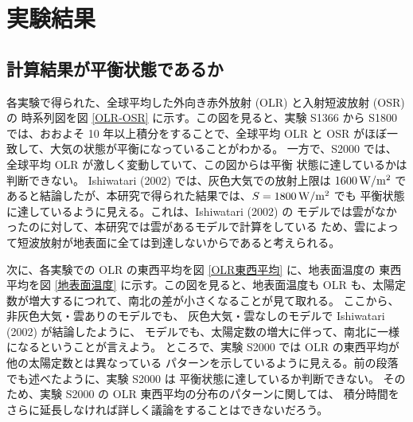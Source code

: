 \documentclass[body]{subfiles}
\begin{document}
\chapter{実験結果}

\section{計算結果が平衡状態であるか}

各実験で得られた、全球平均した外向き赤外放射 (OLR) と入射短波放射 (OSR) の
時系列図を図 \ref{OLR-OSR} に示す。この図を見ると、実験 S1366
から S1800 では、おおよそ 10 年以上積分をすることで、全球平均
OLR と OSR がほぼ一致して、大気の状態が平衡になっていることがわかる。
一方で、S2000 では、全球平均 OLR が激しく変動していて、この図からは平衡
状態に達しているかは判断できない。
Ishiwatari \etal (2002) では、灰色大気での放射上限は \(1600\hmu{W/m^2}\)
であると結論したが、本研究で得られた結果では、\(S=1800\hmu{W/m^2}\) でも
平衡状態に達しているように見える。これは、Ishiwatari \etal (2002) の
モデルでは雲がなかったのに対して、本研究では雲があるモデルで計算をしている
ため、雲によって短波放射が地表面に全ては到達しないからであると考えられる。

次に、各実験での OLR の東西平均を図 \ref{OLR東西平均} に、地表面温度の
東西平均を図 \ref{地表面温度} に示す。この図を見ると、地表面温度も
OLR も、太陽定数が増大するにつれて、南北の差が小さくなることが見て取れる。
ここから、非灰色大気・雲ありのモデルでも、
灰色大気・雲なしのモデルで Ishiwatari \etal (2002) が結論したように、
モデルでも、太陽定数の増大に伴って、南北に一様になるということが言えよう。
ところで、実験 S2000 では OLR の東西平均が他の太陽定数とは異なっている
パターンを示しているように見える。前の段落でも述べたように、実験 S2000 は
平衡状態に達しているか判断できない。
そのため、実験 S2000 の OLR 東西平均の分布のパターンに関しては、
積分時間をさらに延長しなければ詳しく議論をすることはできないだろう。
\end{document}

